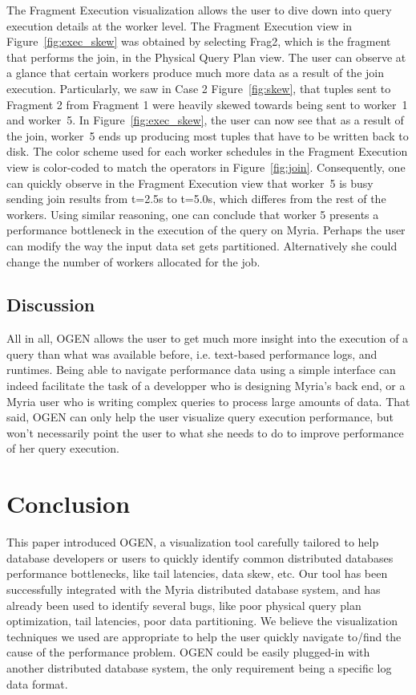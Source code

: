 \documentclass{chi2009}
\newcommand*{\system}{OGEN\xspace}
\newcommand*{\graph}{Physical Query Plan\xspace}
\newcommand*{\fragment}{Fragment Execution\xspace}
\begin{document}
The \fragment visualization allows the user to dive down into query execution details at the worker level. The \fragment view in Figure~\ref{fig:exec_skew} was obtained by selecting Frag2, which is the fragment that performs the join, in the \graph view. The user can observe at a glance that certain workers produce much more data as a result of the join execution. Particularly, we saw in Case 2 Figure~\ref{fig:skew}, that tuples sent to Fragment 2 from Fragment 1 were heavily skewed towards being sent to worker~1 and worker~5. In Figure~\ref{fig:exec_skew}, the user can now see that as a result of the join, worker~5 ends up producing most tuples that have to be written back to disk. The color scheme used for each worker schedules in the \fragment view is color-coded to match the operators in Figure~\ref{fig:join}. Consequently, one can quickly observe in the \fragment view that worker~5 is busy sending join results from t=2.5s to t=5.0s, which differes from the rest of the workers. Using similar reasoning, one can conclude that worker 5 presents a performance bottleneck in the execution of the query on Myria. Perhaps the user can modify the way the input data set gets partitioned. Alternatively she could change the number of workers allocated for the job. 

\subsection{Discussion}

All in all, \system allows the user to get much more insight into the execution of a query than what was available before, i.e. text-based performance logs, and runtimes. Being able to navigate performance data using a simple interface can indeed facilitate the task of a developper who is designing Myria's back end, or a Myria user who is writing complex queries to process large amounts of data. That said, \system can only help the user visualize query execution performance, but won't necessarily point the user to what she needs to do to improve performance of her query execution. 


\section{Conclusion}


This paper introduced \system, a visualization tool carefully tailored to help
database developers or users to quickly identify common distributed databases
performance bottlenecks, like tail latencies, data skew, etc. Our tool has been
successfully integrated with the Myria distributed database system, and has already
been used to identify several bugs, like poor physical query plan optimization,
tail latencies, poor data partitioning. We believe the visualization techniques
we used are appropriate to help the user quickly navigate to/find the cause of the
performance problem. \system could be easily plugged-in with another
distributed database system, the only requirement being a specific log data
format.  
\end{document}
